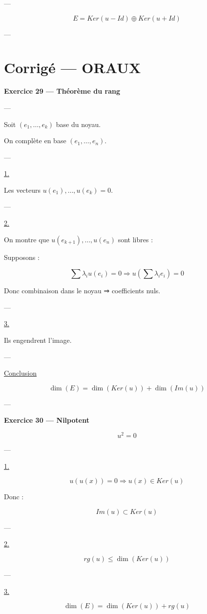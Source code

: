 \documentclass[11pt,a4paper]{article}
\begin{document}
---

\[
\boxed{E = Ker(u-Id) \oplus Ker(u+Id)}
\]

---

\section{Corrigé — ORAUX}

\textbf{Exercice 29 — Théorème du rang}

---

Soit $(e_1,\dots,e_k)$ base du noyau.

On complète en base $(e_1,\dots,e_n)$.

---

\underline{1.}

Les vecteurs $u(e_1),\dots,u(e_k)=0$.

---

\underline{2.}

On montre que $u(e_{k+1}),\dots,u(e_n)$ sont libres :

Supposons :

\[
\sum \lambda_i u(e_i)=0
\Rightarrow u\left(\sum \lambda_i e_i\right)=0
\]

Donc combinaison dans le noyau ⇒ coefficients nuls.

---

\underline{3.}

Ils engendrent l’image.

---

\underline{Conclusion}

\[
\boxed{\dim(E)=\dim(Ker(u))+\dim(Im(u))}
\]

---

\textbf{Exercice 30 — Nilpotent}

\[
u^2=0
\]

---

\underline{1.}

\[
u(u(x))=0 \Rightarrow u(x)\in Ker(u)
\]

Donc :

\[
Im(u)\subset Ker(u)
\]

---

\underline{2.}

\[
rg(u)\leq \dim(Ker(u))
\]

---

\underline{3.}

\[
\dim(E)=\dim(Ker(u))+rg(u)
\]
\end{document}
